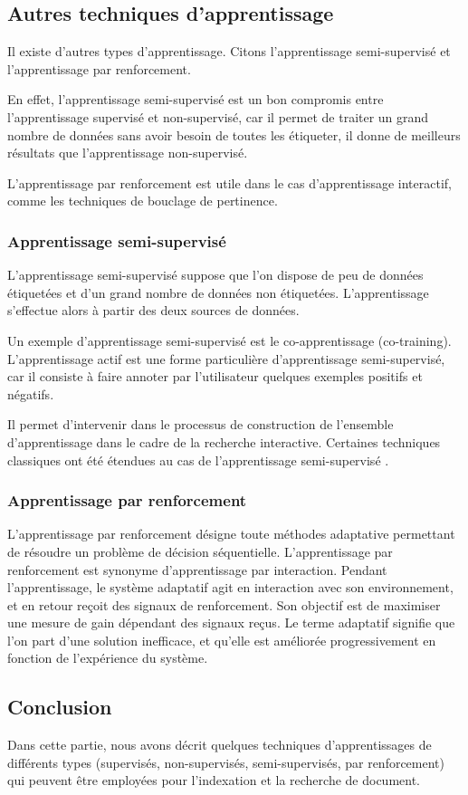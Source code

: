 \documentclass[12pt]{article}
\begin{document}
\subsection{Autres techniques d'apprentissage}
Il existe d'autres types d'apprentissage. Citons l'apprentissage semi-supervisé et l'apprentissage par renforcement.

En effet, l'apprentissage semi-supervisé est un bon compromis entre l'apprentissage supervisé et non-supervisé, car il permet de traiter un grand nombre de données sans avoir besoin de toutes les étiqueter, il donne de meilleurs résultats que l'apprentissage non-supervisé.

L'apprentissage par renforcement est utile dans le cas d'apprentissage interactif, comme les techniques de bouclage de pertinence.
\subsubsection{Apprentissage semi-supervisé}
L’apprentissage semi-supervisé suppose que l’on dispose de peu de données étiquetées et d’un grand nombre de données non étiquetées. L’apprentissage s’effectue alors à partir des deux sources de données.
	
Un exemple d'apprentissage semi-supervisé est le co-apprentissage (co-training). L'apprentissage actif est une forme particulière d'apprentissage semi-supervisé, car il consiste à faire annoter par l'utilisateur quelques exemples positifs et négatifs.
	
Il permet d'intervenir dans le processus de construction de l'ensemble d'apprentissage dans le cadre de la recherche interactive. Certaines techniques classiques ont été étendues au cas de l'apprentissage semi-supervisé \cite{8}.
\subsubsection{Apprentissage par renforcement}
L’apprentissage par renforcement désigne toute méthodes adaptative permettant de résoudre un problème de décision séquentielle. L'apprentissage par renforcement est synonyme d'apprentissage par interaction. Pendant l'apprentissage, le système adaptatif agit en interaction avec son environnement, et en retour reçoit des signaux de renforcement. Son objectif est de maximiser une mesure de gain dépendant des signaux reçus. Le terme adaptatif signifie que l'on part d'une solution inefficace, et qu'elle est améliorée progressivement en fonction de l'expérience du système.
\subsection{Conclusion}
Dans cette partie, nous avons décrit quelques techniques d'apprentissages de différents types (supervisés, non-supervisés, semi-supervisés, par renforcement) qui peuvent être employées pour l'indexation et la recherche de document.
\end{document}
